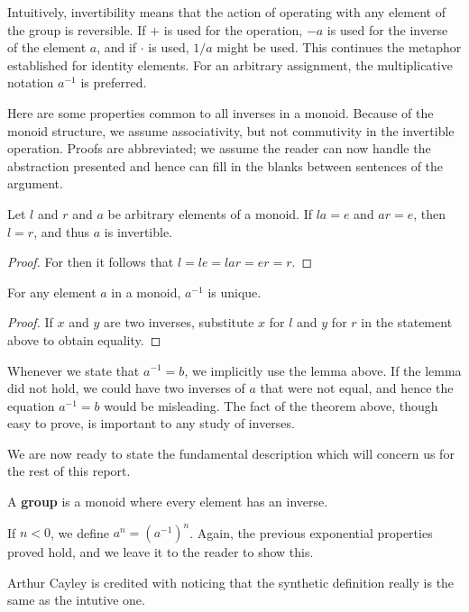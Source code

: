 Intuitively, invertibility means that the action of operating with any element of the group is reversible. If $+$ is used for the operation, $-a$ is used for the inverse of the element $a$, and if $\cdotp$ is used, $1/a$ might be used. This continues the metaphor established for identity elements. For an arbitrary assignment, the multiplicative notation  $a^{-1}$ is preferred.

Here are some properties common to all inverses in a monoid. Because of the monoid structure, we assume associativity, but not commutivity in the invertible operation. Proofs are abbreviated; we assume the reader can now handle the abstraction presented and hence can fill in the blanks between sentences of the argument.

\begin{lemma} Let $l$ and $r$ and $a$ be arbitrary elements of a monoid. If $la = e$ and $ar = e$, then $l = r$, and thus $a$ is invertible. \end{lemma}
\begin{proof} For then it follows that $l = le = lar = er = r$. \end{proof}

\begin{corollary} For any element $a$ in a monoid, $a^{-1}$ is unique. \end{corollary}
\begin{proof} If $x$ and $y$ are two inverses, substitute $x$ for $l$ and $y$ for $r$ in the statement above to obtain equality. \end{proof}

Whenever we state that $a^{-1} = b$, we implicitly use the lemma above. If the lemma did not hold, we could have two inverses of $a$ that were not equal, and hence the equation $a^{-1} = b$ would be misleading. The fact of the theorem above, though easy to prove, is important to any study of inverses.

We are now ready to state the fundamental description which will concern us for the rest of this report.

\begin{definition}
    A {\bf group} is a monoid where every element has an inverse.
\end{definition}

If $n < 0$, we define $a^n = (a^{-1})^{n}$. Again, the previous exponential properties proved hold, and we leave it to the reader to show this.

Arthur Cayley is credited with noticing that the synthetic definition really is the same as the intutive one.

